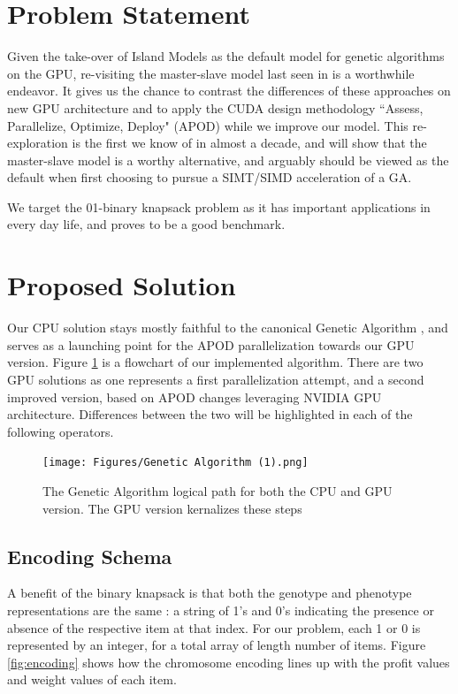 \documentclass[11pt]{article}       %
\begin{document}
\section{Problem Statement} \label{probstat}
Given the take-over of Island Models as the default model for genetic algorithms on the GPU, re-visiting the master-slave model last seen in \cite{Cavuoti2013-oy} is a worthwhile endeavor. It gives us the chance to contrast the differences of these approaches on new GPU architecture and to apply the CUDA design methodology ``Assess, Parallelize, Optimize, Deploy" (APOD) \cite{bradley_2012} while we improve our model. This re-exploration is the first we know of in almost a decade, and will show that the master-slave model is a worthy alternative, and arguably should be viewed as the default when first choosing to pursue a SIMT/SIMD  acceleration of a GA. 

We target the 01-binary knapsack problem as it has important applications in every day life, and proves to be a good benchmark.

\section{Proposed Solution} \label{propsol}
Our CPU solution stays mostly faithful to the canonical Genetic Algorithm \cite{holland1984genetic}, and serves as a launching point for the APOD parallelization towards our GPU version. Figure \ref{fig:GA} is a flowchart of our implemented algorithm. There are two GPU solutions as one represents a first parallelization attempt, and a second improved version, based on APOD changes leveraging NVIDIA GPU architecture. Differences between the two will be highlighted in each of the following operators.

\begin{figure}[h]
    \centering
    \texttt{[image: Figures/Genetic Algorithm (1).png]}
    \caption{The Genetic Algorithm logical path for both the CPU and GPU version. The GPU version kernalizes these steps}
    \label{fig:GA}
\end{figure}
\subsection{Encoding Schema}
A benefit of the binary knapsack is that both the genotype and phenotype representations are the same : a string of 1's and 0's indicating the presence or absence of the respective item at that index. For our problem, each 1 or 0 is represented by an integer, for a total array of length number of items. Figure \ref{fig:encoding} shows how the chromosome encoding lines up with the profit values and weight values of each item.
\end{document}
